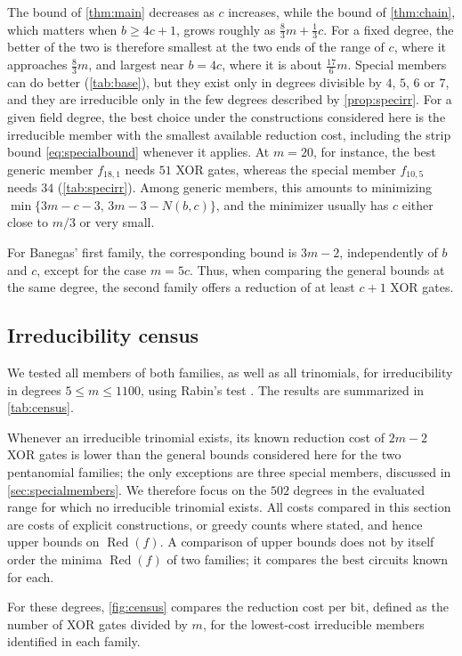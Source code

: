 \documentclass{ieeeaccess}
\theoremstyle{plain}
\theoremstyle{definition}
\newcommand{\Red}{\operatorname{Red}}
\begin{document}
The bound of \cref{thm:main} decreases as $c$ increases, while the bound of
\cref{thm:chain}, which matters when $b\ge4c+1$, grows roughly as
$\tfrac83m+\tfrac13c$. For a fixed degree, the better of the two is therefore
smallest at the two ends of the range of $c$, where it approaches $\tfrac83m$,
and largest near $b=4c$, where it is about $\tfrac{17}6m$. Special members can
do better (\cref{tab:base}), but they exist only in degrees divisible by $4$,
$5$, $6$ or $7$, and they are irreducible only in the few degrees described by
\cref{prop:specirr}. For a given field degree, the best choice under the
constructions considered here is the irreducible member with the smallest
available reduction cost, including the strip bound \eqref{eq:specialbound}
whenever it applies. At $m=20$, for instance, the best generic member $f_{18,1}$
needs $51$ XOR gates, whereas the special member $f_{10,5}$ needs $34$
(\cref{tab:specirr}). Among generic members, this amounts to minimizing
$\min\{3m-c-3,\,3m-3-N(b,c)\}$, and the minimizer usually has $c$ either close
to $m/3$ or very small.

For Banegas' first family, the corresponding bound is $3m-2$, independently of
$b$ and $c$, except for the case $m=5c$. Thus, when comparing the
general bounds at the same degree, the second family offers a reduction of at
least $c+1$ XOR gates.

\subsection{Irreducibility census}

We tested all members of both families, as well as all trinomials, for
irreducibility in degrees $5\le m\le1100$, using Rabin's test \cite{Rabin1980}.
The results are summarized in \cref{tab:census}.

Whenever an irreducible trinomial exists, its known reduction cost of $2m-2$ XOR
gates is lower than the general bounds considered here for the two pentanomial
families; the only exceptions are three special members, discussed in
\cref{sec:specialmembers}. We therefore focus on the $502$ degrees in the evaluated range for
which no irreducible trinomial exists.
All costs compared in this section are costs of explicit constructions, or
greedy counts where stated, and hence upper bounds on $\Red(f)$. A comparison
of upper bounds does not by itself order the minima $\Red(f)$ of two families;
it compares the best circuits known for each.

For these degrees, \cref{fig:census} compares the reduction cost per bit,
defined as the number of XOR gates divided by $m$, for the lowest-cost
irreducible members identified in each family.
\end{document}
